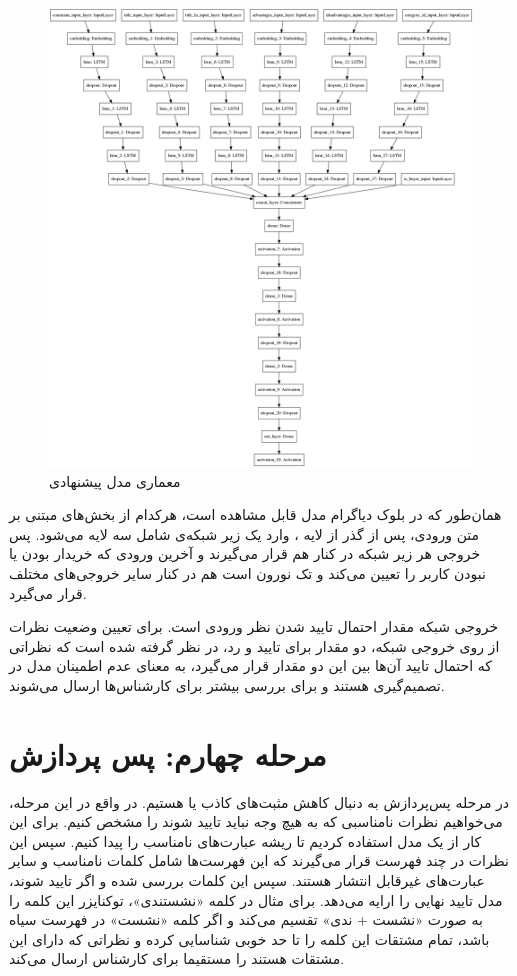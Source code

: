 \begin{figure}[H]
\centering
\includegraphics[width=15cm]{figs/Model1.png}
\caption{معماری مدل پیشنهادی}\label{}
\label{fig:test}
\end{figure}

همان‌طور که در بلوک دیاگرام مدل قابل مشاهده است، هرکدام از بخش‌های مبتنی بر متن ورودی، پس از گذر از لایه ، وارد یک زیر شبکه‌ی شامل سه لایه  می‌شود. پس خروجی هر زیر شبکه  در کنار هم قرار می‌گیرند و آخرین ورودی که خریدار بودن یا نبودن کاربر را تعیین می‌کند و تک نورون است هم در کنار سایر خروجی‌های مختلف قرار می‌گیرد.

خروجی شبکه مقدار احتمال تایید شدن نظر ورودی است. برای تعیین وضعیت نظرات از روی خروجی شبکه، دو مقدار  برای تایید و رد، در نظر گرفته شده‌ است که نظراتی که احتمال تایید آن‌ها بین این دو مقدار قرار می‌گیرد، به معنای عدم اطمینان مدل در تصمیم‌گیری هستند و برای بررسی بیشتر برای کارشناس‌ها ارسال می‌شوند.


\section{مرحله چهارم: پس پردازش}
در مرحله پس‌پردازش به دنبال کاهش مثبت‌های کاذب یا 
هستیم. در واقع در این مرحله، می‌خواهیم نظرات نامناسبی که به هیچ وجه نباید تایید شوند را مشخص کنیم. برای این کار از  یک مدل  استفاده کردیم تا ریشه عبارت‌های نامناسب را پیدا کنیم. سپس این نظرات در چند فهرست قرار می‌گیرند که این فهرست‌ها شامل کلمات نامناسب و سایر عبارت‌های غیرقابل انتشار هستند. سپس این کلمات بررسی شده و اگر تایید شوند، مدل تایید نهایی را ارایه می‌دهد.
برای مثال در کلمه‌ «نشستندی»، توکنایزر این کلمه را  به صورت «نشست + ندی» تقسیم می‌کند و اگر کلمه «نشست» در فهرست سیاه باشد،  تمام مشتقات این کلمه را تا حد خوبی شناسایی کرده و نظراتی که دارای این مشتقات هستند را مستقیما برای کارشناس ارسال می‌کند.

